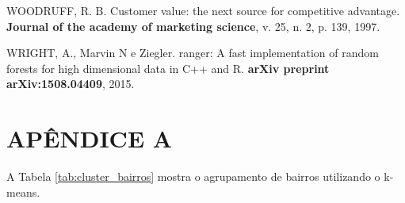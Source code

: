\documentclass[
	12pt,				%
	a4paper,		%
	oneside,    %
	chapter=TITLE,		   %
	section=TITLE,		   %
	subsection=TITLE,	   %
	subsubsection=TITLE, %
	english,			%
	french,				%
	spanish,			%
	brazil,				%
]{abntex2}
\begin{document}
\leavevmode\hypertarget{ref-woodruff1997customer}{}%
WOODRUFF, R. B. Customer value: the next source for competitive
advantage. \textbf{Journal of the academy of marketing science}, v. 25,
n. 2, p. 139, 1997.

\leavevmode\hypertarget{ref-wright2015ranger}{}%
WRIGHT, A., Marvin N e Ziegler. ranger: A fast implementation of random
forests for high dimensional data in C++ and R. \textbf{arXiv preprint
arXiv:1508.04409}, 2015.

\hypertarget{apuxeandice-a}{%
\chapter*{APÊNDICE A}\label{apuxeandice-a}}

A Tabela \ref{tab:cluster_bairros} mostra o agrupamento de bairros
utilizando o k-means.
\end{document}
